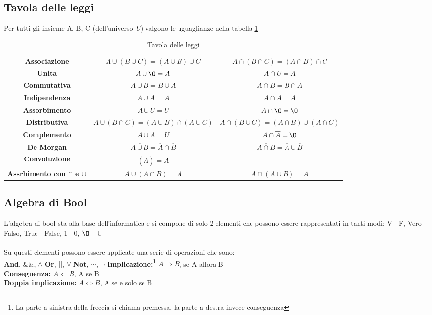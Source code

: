 \vspace{-5pt}
\subsection{Tavola delle leggi}
Per tutti gli insieme A, B, C (dell'universo \textit{U}) valgono le uguaglianze nella tabella \ref{tab:leggi-insiemi}
\begin{table}[h!]
    \centering
    \setlength{\tabcolsep}{8pt}
    \renewcommand{\arraystretch}{2}
    \begin{tabular}{|c|c c|}
        \hline
        \textbf{Associazione} & $A \cup (B \cup C) = (A \cup B) \cup C$ & $A \cap (B \cap C) = (A \cap B) \cap C$ \\
        \textbf{Unita} & $A \cup \O = A$ & $A \cap U = A$ \\
        \textbf{Commutativa} & $A \cup B = B \cup A$ & $A \cap B = B \cap A$ \\
        \textbf{Indipendenza} & $A \cup A = A$ & $A \cap A = A$ \\
        \textbf{Assorbimento} & $A \cup U = U$ & $A \cap \O = \O$ \\
        \textbf{Distributiva} & $A \cup (B \cap C) = (A \cup B) \cap (A \cup C)$ & $A \cap (B \cup C) = (A \cap B) \cup (A \cap C)$ \\
        \textbf{Complemento} & $A \cup \overline{A} = U$ & $A \cap \overline{A} = \O$ \\
        \textbf{De Morgan} & $\overline{A \cup B} = \overline{A} \cap \overline{B}$ & $\overline{A \cap B} = \overline{A} \cup \overline{B}$ \\
        \textbf{Convoluzione} & $\overline{(\overline{A})} = A$ &  \\
        \textbf{Assrbimento con $\cap$ e $\cup$} & $A \cup (A \cap B) = A$ & $A \cap (A \cup B) = A$ \\
        \hline
    \end{tabular}
    \caption{Tavola delle leggi}
    \label{tab:leggi-insiemi}
\end{table}

\newpage
\subsection{Algebra di Bool}
L'algebra di bool sta alla base dell'informatica e si compone di solo 2 elementi che possono essere rappresentati in tanti modi: V - F, Vero - Falso, True - False, 1 - 0, $\O$ - U \\ \\
Su questi elementi possono essere applicate una serie di operazioni che sono: \\
\textbf{And}, \&\&, $\land$ \hspace{.3cm} \textbf{Or}, $||$, $\lor$ \hspace{.3cm} \textbf{Not}, $\sim$, $\lnot$
\textbf{Implicazione:}\footnote{La parte a sinistra della freccia si chiama premessa, la parte a destra invece conseguenza} $A \Longrightarrow B$, se A allora B \\
\textbf{Conseguenza:} $A \Longleftarrow B$, A se B \\ 
\textbf{Doppia implicazione:} $A \iff B$, A se e solo se B

